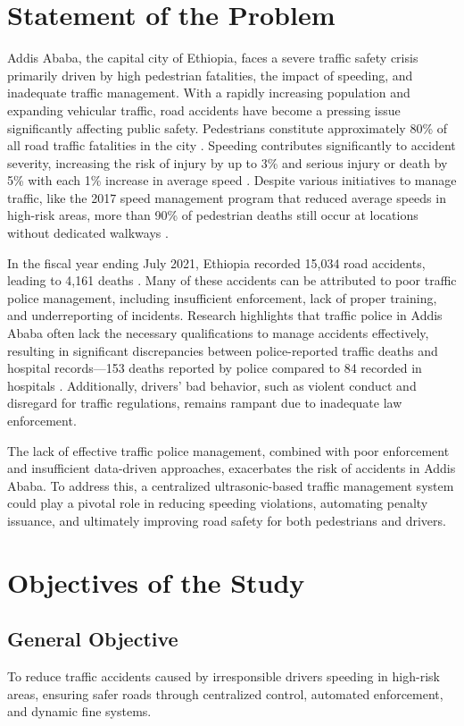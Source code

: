 \section{Statement of the Problem}
Addis Ababa, the capital city of Ethiopia, faces a severe traffic safety crisis primarily driven by high pedestrian fatalities, the impact of speeding, and inadequate traffic management. With a rapidly increasing population and expanding vehicular traffic, road accidents have become a pressing issue significantly affecting public safety. Pedestrians constitute approximately 80\% of all road traffic fatalities in the city \cite{unece2021}. Speeding contributes significantly to accident severity, increasing the risk of injury by up to 3\% and serious injury or death by 5\% with each 1\% increase in average speed \cite{vital2019}. Despite various initiatives to manage traffic, like the 2017 speed management program that reduced average speeds in high-risk areas, more than 90\% of pedestrian deaths still occur at locations without dedicated walkways \cite{wikipedia2021}.

In the fiscal year ending July 2021, Ethiopia recorded 15,034 road accidents, leading to 4,161 deaths \cite{pmid2021}. Many of these accidents can be attributed to poor traffic police management, including insufficient enforcement, lack of proper training, and underreporting of incidents. Research highlights that traffic police in Addis Ababa often lack the necessary qualifications to manage accidents effectively, resulting in significant discrepancies between police-reported traffic deaths and hospital records—153 deaths reported by police compared to 84 recorded in hospitals \cite{acrs2019}. Additionally, drivers’ bad behavior, such as violent conduct and disregard for traffic regulations, remains rampant due to inadequate law enforcement.

The lack of effective traffic police management, combined with poor enforcement and insufficient data-driven approaches, exacerbates the risk of accidents in Addis Ababa. To address this, a centralized ultrasonic-based traffic management system could play a pivotal role in reducing speeding violations, automating penalty issuance, and ultimately improving road safety for both pedestrians and drivers.

\section{Objectives of the Study}

\subsection{General Objective}
To reduce traffic accidents caused by irresponsible drivers speeding in high-risk areas, ensuring safer roads through centralized control, automated enforcement, and dynamic fine systems.


